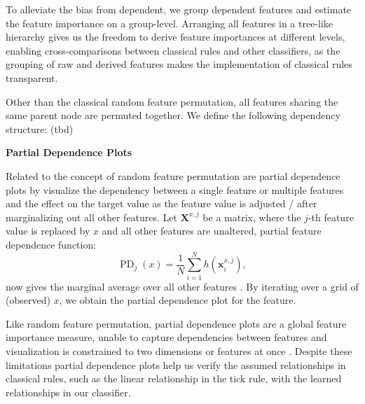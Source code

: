 
To alleviate the bias from dependent, we group dependent features and estimate the feature importance on a group-level. Arranging all features in a tree-like hierarchy gives us the freedom to derive feature importances at different levels, enabling cross-comparisons between classical rules and other classifiers, as the grouping of raw and derived features makes the implementation of classical rules transparent.


Other than the classical random feature permutation, all features sharing the same parent node are permuted together. We define the following dependency structure:
(tbd)

\textbf{Partial Dependence Plots}

Related to the concept of random feature permutation are partial dependence plots by \textcite[][26--28]{friedmanGreedyFunctionApproximation2001} visualize the dependency between a single feature or multiple features and the effect on the target value as the feature value is adjusted / after marginalizing out all other features. Let $\mathbf{X}^{x,j}$ be a matrix, where the $j$-th feature value is replaced by $x$ and all other features are unaltered, partial feature dependence function:
\begin{equation}
    \operatorname{PD}_{j}(x) = \frac{1}{N} \sum_{i=1}^{N} h(\mathbf{x}^{x,j}_{i}),
\end{equation}
now gives the marginal average over all other features \autocite[][81]{hookerUnrestrictedPermutationForces2021}. By iterating over a grid of (observed) $x$, we obtain the partial dependence plot for the feature.

Like random feature permutation, partial dependence plots are a global feature importance measure, unable to capture dependencies between features and visualization is constrained to two dimensions or features at once \autocite[][p. 388]{hastietrevorElementsStatisticalLearning2009}. Despite these limitations partial dependence plots help us verify the assumed relationships in classical rules, such as the linear relationship in the tick rule, with the learned relationships in our classifier.


